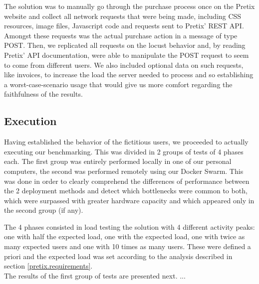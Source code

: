 \documentclass[12pt]{article}
\begin{document}
The solution was to manually go through the purchase process once on the Pretix website and collect all network requests that were being made, including CSS 
resources, image files, Javascript code and requests sent to Pretix' REST API.
Amongst these requests was the actual purchase action in a message of type POST.
Then, we replicated all requests on the locust behavior and, by reading Pretix' API documentation, were able to manipulate the POST request to seem to come 
from different users.
We also included optional data on such requests, like invoices, to increase the load the server needed to process and so establishing a worst-case-scenario usage 
that would give us more comfort regarding the faithfulness of the results.

\subsection{Execution} \label{performance.execution} %


Having established the behavior of the fictitious users, we proceeded to actually executing our benchmarking.
This was divided in 2 groups of tests of 4 phases each.
The first group was entirely performed locally in one of our personal computers, the second was performed remotely using our Docker Swarm.
This was done in order to clearly comprehend the differences of performance between the 2 deployment methods and detect which bottlenecks were common to both, 
which were surpassed with greater hardware capacity and which appeared only in the second group (if any).

The 4 phases consisted in load testing the solution with 4 different activity peaks: one with half the expected load, one with the expected load, one with 
twice as many expected users and one with 10 times as many users.
These were defined a priori and the expected load was set according to the analysis described in section \ref{pretix.requirements}. \\

The results of the first group of tests are presented next.
... \\





\end{document}
